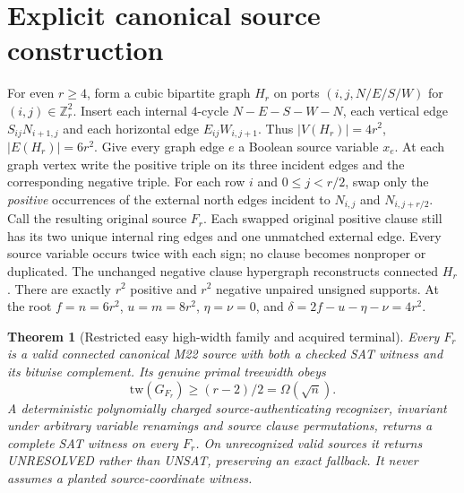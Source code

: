 \documentclass[11pt]{article}
\newtheorem{theorem}{Theorem}
\begin{document}
\section*{Explicit canonical source construction}
For even $r\ge4$, form a cubic bipartite graph $H_r$ on ports $(i,j,N/E/S/W)$ for $(i,j)\in\mathbb Z_r^2$. Insert each internal $4$-cycle $N-E-S-W-N$, each vertical edge $S_{ij}N_{i+1,j}$ and each horizontal edge $E_{ij}W_{i,j+1}$. Thus $|V(H_r)|=4r^2$, $|E(H_r)|=6r^2$. Give every graph edge $e$ a Boolean source variable $x_e$. At each graph vertex write the positive triple on its three incident edges and the corresponding negative triple. For each row $i$ and $0\le j<r/2$, swap only the \emph{positive} occurrences of the external north edges incident to $N_{i,j}$ and $N_{i,j+r/2}$. Call the resulting original source $F_r$.
Each swapped original positive clause still has its two unique internal ring edges and one unmatched external edge. Every source variable occurs twice with each sign; no clause becomes nonproper or duplicated. The unchanged negative clause hypergraph reconstructs connected $H_r$. There are exactly $r^2$ positive and $r^2$ negative unpaired unsigned supports. At the root $f=n=6r^2$, $u=m=8r^2$, $\eta=\nu=0$, and $\delta=2f-u-\eta-\nu=4r^2$.
\begin{theorem}[Restricted easy high-width family and acquired terminal]
Every $F_r$ is a valid connected canonical M22 source with both a checked SAT witness and its bitwise complement. Its genuine primal treewidth obeys
\[
\mathrm{tw}(G_{F_r})\ge(r-2)/2=\Omega(\sqrt{n}).
\]
A deterministic polynomially charged source-authenticating recognizer, invariant under arbitrary variable renamings and source clause permutations, returns a complete SAT witness on every $F_r$. On unrecognized valid sources it returns UNRESOLVED rather than UNSAT, preserving an exact fallback. It never assumes a planted source-coordinate witness.
\end{theorem}
\end{document}
